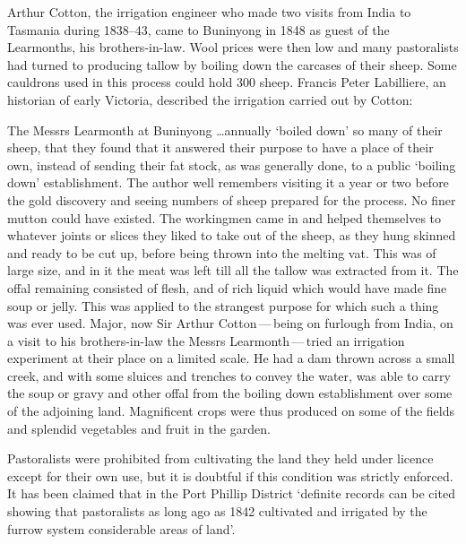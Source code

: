 Arthur Cotton,  the irrigation engineer who made two
visits from India to Tasmania during 1838--43, came to Buninyong in
1848 as guest of the Learmonths, his brothers-in-law.  Wool
 prices were then low and many pastoralists had turned to
producing tallow by boiling down the carcases of their
sheep.  Some cauldrons used in this process could hold
300 sheep.  Francis Peter Labilliere,
 an historian of early Victoria, described
the irrigation carried out by Cotton:
\begin{Quote}
	The Messrs Learmonth at Buninyong \ldots annually `boiled
	down' so many of their sheep, that they found that it answered
	their purpose to have a place of their own, instead of sending
	their fat stock, as was generally done, to a public `boiling
	down' establishment.  The author well remembers visiting it a
	year or two before the gold discovery and seeing numbers of
	sheep prepared for the process.  No finer mutton could have
	existed.  The workingmen came in and helped themselves to
	whatever joints or slices they liked to take out of the sheep,
	as they hung skinned and ready to be cut up, before being
	thrown into the melting vat.  This was of large size, and in
	it the meat was left till all the tallow was extracted from
	it.  The offal remaining consisted of flesh, and of rich
	liquid which would have made fine soup or jelly.  This was
	applied to the strangest purpose for which such a thing was
	ever used.  Major, now Sir Arthur Cotton\,---\,being on
	furlough from India, on a visit to his brothers-in-law the
	Messrs Learmonth\,---\,tried an irrigation experiment at their
	place on a limited scale.  He had a dam
	thrown across a small creek, and with some
	sluices and trenches to convey
	the water, was able to carry the soup or gravy and other offal
	from the boiling down establishment over some of the adjoining
	land.  Magnificent crops were thus produced on some of the
	fields and splendid vegetables and
	fruit in the
	garden.
\end{Quote}

Pastoralists were prohibited from cultivating the land they held under
licence except for their own use, but it is doubtful if this condition
was strictly enforced.  It has been claimed that in the Port Phillip
District `definite records can be cited showing that pastoralists as
long ago as 1842 cultivated and irrigated by the furrow system
considerable areas of land'.

